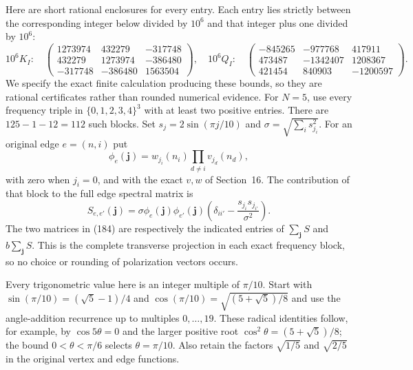 \documentclass[11pt]{article}
\begin{document}
Here are short rational enclosures for every entry. Each entry lies
strictly between the corresponding integer below divided by $10^6$
and that integer plus one divided by $10^6$:
\begin{equation}\label{eq:vertex-certificate-matrices}
 10^6K_I:\quad
 \begin{pmatrix}
 1273974&432279&-317748\\
 432279&1273974&-386480\\
 -317748&-386480&1563504
 \end{pmatrix},\quad
 10^6Q_I:\quad
 \begin{pmatrix}
 -845265&-977768&417911\\
 473487&-1342407&1208367\\
 421454&840903&-1200597
 \end{pmatrix}.
\end{equation}
We specify the exact finite calculation producing these bounds, so
they are rational certificates rather than rounded numerical evidence.
For $N=5$, use every frequency triple in
$\{0,1,2,3,4\}^3$ with at least two positive entries. There are
$125-1-12=112$ such blocks. Set
$s_j=2\sin(\pi j/10)$ and $\sigma=\sqrt{\sum_i s_{j_i}^2}$.
For an original edge $e=(n,i)$ put
\[
 \phi_e(\boldsymbol j)=w_{j_i}(n_i)\prod_{d\ne i}v_{j_d}(n_d),
\]
with zero when $j_i=0$, and with the exact $v,w$ of Section~16.
The contribution of that block to the full edge spectral matrix is
\begin{equation}\label{eq:vertex-projector-sum}
 S_{e,e'}(\boldsymbol j)=\sigma\phi_e(\boldsymbol j)
 \phi_{e'}(\boldsymbol j)
       \left(\delta_{i i'}-\frac{s_{j_i}s_{j_{i'}}}{\sigma^2}\right).
\end{equation}
The two matrices in (184) are
respectively the indicated entries of $\sum_{\boldsymbol j}S$
and $b\sum_{\boldsymbol j}S$. This is the complete transverse
projection in each exact frequency block, so no choice or rounding
of polarization vectors occurs.

Every trigonometric value here is an integer multiple of $\pi/10$.
Start with
$\sin(\pi/10)=(\sqrt5-1)/4$ and
$\cos(\pi/10)=\sqrt{(5+\sqrt5)/8}$ and use the angle-addition
recurrence up to multiples $0,\ldots,19$. These radical identities
follow, for example, by $\cos5\theta=0$ and the larger positive
root $\cos^2\theta=(5+\sqrt5)/8$; the bound $0<\theta<\pi/6$
selects $\theta=\pi/10$. Also retain the factors $\sqrt{1/5}$
and $\sqrt{2/5}$ in the original vertex and edge functions.
\end{document}
